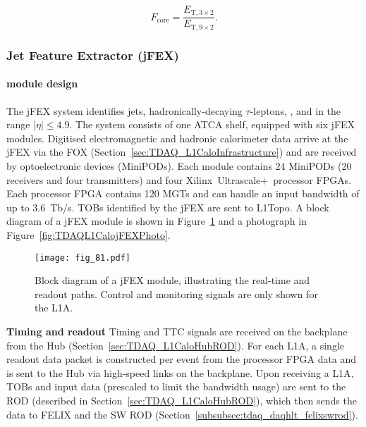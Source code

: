\documentclass[cernpreprint, atlasdraft=false, UKenglish,british,orcidlogo, texmf, orcidlogo]{atlasdoc}
\begin{document}
\begin{equation} F_{\mathrm{core}} = \frac{E_{\mathrm{T}, 3\times2}}{E_{\mathrm{T}, 9\times2}}. \end{equation}
 
 
\subsubsection{Jet Feature Extractor (jFEX)}\label{sec:TDAQ_jFEX}
\paragraph{ module design}
The \gls{jFEX} system identifies jets, hadronically-decaying $\tau$-leptons, \MET, and \sumET in the range $|\eta| \le 4.9$.  The system consists of one \gls{ATCA} shelf, equipped with six \gls{jFEX} modules.  Digitised electromagnetic and hadronic calorimeter data arrive at the \gls{jFEX} via the \gls{FOX} (Section~\ref{sec:TDAQ_L1CaloInfrastructure}) and are received by optoelectronic devices (MiniPODs).  Each module contains 24 MiniPODs (20 receivers and four transmitters) and four Xilinx\textregistered~Ultrascale+\texttrademark~processor \glspl{FPGA}.  Each processor \gls{FPGA} contains 120 \glspl{MGT} and can handle an input bandwidth of up to \SI{3.6}{Tb/\s}.  \glspl{TOB} identified by the \gls{jFEX} are sent to \gls{L1Topo}.  A block diagram of a \gls{jFEX} module is shown in Figure~\ref{fig:TDAQL1CalojFEXBlockDiagram} and a photograph in Figure~\ref{fig:TDAQL1CalojFEXPhoto}.
 
\begin{figure}[htbp]
\centerline{\texttt{[image: fig\_81.pdf]}}
\caption{Block diagram of a \gls{jFEX} module, illustrating the real-time and readout paths.  Control and monitoring signals are only shown for the \gls{L1A}.}
\label{fig:TDAQL1CalojFEXBlockDiagram}
\end{figure}
 
\textbf{Timing and readout}
Timing and \gls{TTC} signals are received on the backplane from the \gls{Hub} (Section~\ref{sec:TDAQ_L1CaloHubROD}). For each \gls{L1A}, a single readout data packet is constructed per event from the processor \gls{FPGA} data and is sent to the \gls{Hub} via high-speed links on the backplane.  Upon receiving a \gls{L1A}, \glspl{TOB} and input data (prescaled to limit the bandwidth usage) are sent to the \gls{ROD} (described in Section~\ref{sec:TDAQ_L1CaloHubROD}), which then sends the data to \gls{FELIX} and the \gls{SW ROD} (Section~\ref{subsubsec:tdaq_daqhlt_felixswrod}).
 
\end{document}
